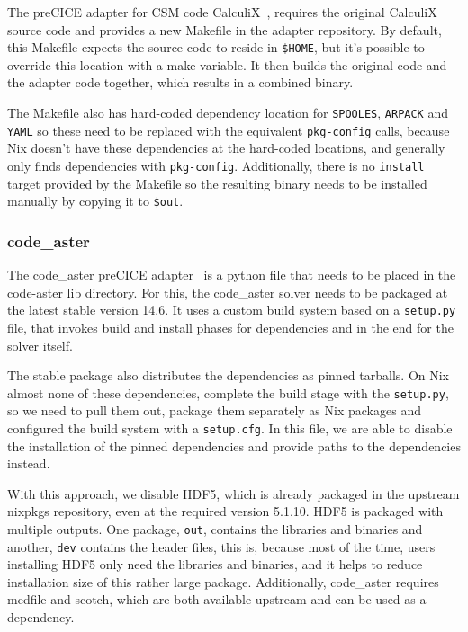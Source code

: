\documentclass{eceasst}
\begin{document}
The preCICE adapter for CSM code CalculiX~\cite{Uekermann2017_Adapters}, requires the original CalculiX source code and provides a new Makefile in the adapter repository.
By default, this Makefile expects the source code to reside in \texttt{\$HOME}, but it's possible to override this location with a make variable.
It then builds the original code and the adapter code together, which results in a combined binary.

The Makefile also has hard-coded dependency location for \texttt{SPOOLES}, \texttt{ARPACK} and \texttt{YAML} so these need to be replaced with the equivalent \texttt{pkg-config} calls, because Nix doesn't have these dependencies at the hard-coded locations, and generally only finds dependencies with \texttt{pkg-config}.
Additionally, there is no \texttt{install} target provided by the Makefile so the resulting binary needs to be installed manually by copying it to \texttt{\$out}.\\

\subsubsection{code\_aster}

The code\_aster preCICE adapter~\cite{Uekermann2017_Adapters} is a python file that needs to be placed in the code-aster lib directory.
For this, the code\_aster solver needs to be packaged at the latest stable version 14.6.
It uses a custom build system based on a \texttt{setup.py} file, that invokes build and install phases for dependencies and in the end for the solver itself.

The stable package also distributes the dependencies as pinned tarballs.
On Nix almost none of these dependencies, complete the build stage with the \texttt{setup.py}, so we need to pull them out, package them separately as Nix packages and configured the build system with a \texttt{setup.cfg}.
In this file, we are able to disable the installation of the pinned dependencies and provide paths to the dependencies instead.

With this approach, we disable HDF5, which is already packaged in the upstream nixpkgs repository, even at the required version 5.1.10.
HDF5 is packaged with multiple outputs.
One package, \texttt{out}, contains the libraries and binaries and another, \texttt{dev} contains the header files, this is, because most of the time, users installing HDF5 only need the libraries and binaries, and it helps to reduce installation size of this rather large package.
Additionally, code\_aster requires medfile and scotch, which are both available upstream and can be used as a dependency.
\end{document}
